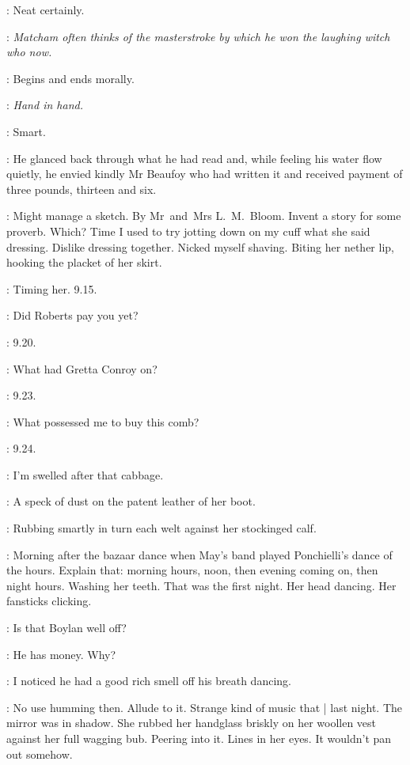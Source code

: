 \BloomInt:
Neat certainly.

\Voice:
\emph{Matcham often thinks of the masterstroke
by which he won the laughing witch who now.}

\BloomInt:
Begins and ends morally.

\Voice:
\emph{Hand in hand.}

\BloomInt:
Smart.

:
He glanced back through what he had read
and, while feeling his water flow quietly,
he envied kindly Mr Beaufoy who had written it
and received payment of three pounds, thirteen and six.

\BloomInt:
Might manage a sketch.
By Mr~and~Mrs L.~M.~Bloom.
Invent a story for some proverb.
Which?
Time I used to try jotting down on my cuff what she said dressing.
Dislike dressing together.
Nicked myself shaving.
Biting her nether lip,
hooking the placket of her skirt.

\BloomInt:
Timing her.
9.15.

\Molly:
Did Roberts pay you yet?

\BloomInt:
9.20.

\Molly:
What had Gretta Conroy on?

\BloomInt:
9.23.

\Molly:
What possessed me to buy this comb?

\BloomInt:
9.24.

\Molly:
I'm swelled after that cabbage.

\BloomInt:
A speck of dust on the patent leather of her boot.

:
Rubbing smartly in turn each welt against her stockinged calf.

\BloomInt:
Morning after the bazaar dance
when May's band played Ponchielli's dance of the hours.
Explain that:
morning hours, noon,
then evening coming on,
then night hours.
Washing her teeth.
That was the first night.
Her head dancing.
Her fansticks clicking.

\Molly:
Is that Boylan well off?

\Bloom:
He has money.
Why?

\Molly:
I noticed he had a good rich smell off his breath dancing.

\BloomInt:
No use humming then.
Allude to it.
Strange kind of music that |
last night.
The mirror was in shadow.
She rubbed her handglass briskly on her woollen vest
against her full wagging bub.
Peering into it.
Lines in her eyes.
It wouldn't pan out somehow.

